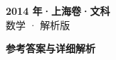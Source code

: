 \documentclass[zihao=-4, a4paper]{ctexart}
\begin{document}
\begin{center}
  {\Large\bfseries 2014 年·上海卷·文科}\\[4pt]
  {\large 数学 · 解析版}
\end{center}
\medskip
{}

\clearpage
{}
\begin{center}{\Large\bfseries 参考答案与详细解析}\end{center}
\medskip

\end{document}
